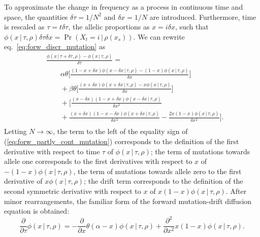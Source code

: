 \documentclass[preprint]{elsarticle}
\newcommand\given{{\,|\,}}
\newcommand\x[1]{\ensuremath{X_{#1}}}
\begin{document}

To approximate the change in frequency as a process in continuous time and space, the quantities $\delta \tau=1/N^2$ and $\delta x=1/N$ are introduced. Furthermore, time is rescaled as $\tau = t\delta \tau$, the allelic proportions as $x=i\delta x$, such that $\phi(x\given\tau,\rho)\delta \tau \delta x =
\Pr(\x{t}=i\given \rho(x_s))$. %
We can rewrite eq.~\eqref{eq:forw_discr_mutation} as
\begin{equation}\label{eq:forw_partly_cont_mutation}
\begin{split}
&%
\frac{\phi(x\given \tau+\delta \tau, \rho)-\phi(x\given \tau, \rho)}{\delta \tau} =\\ 
&\qquad
\alpha\theta \bigg[\frac{(1-x+\delta x)\phi(x-\delta x\given \tau,\rho) - (1-x)\phi(x\given\tau,\rho)}{\delta x}\bigg]\\
&\qquad+\beta\theta \bigg[\frac{(x+\delta x)\phi(x+\delta x\given\tau,\rho) - x\phi(x\given\tau,\rho)}{\delta x}\bigg]\\
&\qquad+\bigg[\frac{(x-\delta x)(1-x+\delta x)\phi(x-\delta x\given\tau,\rho)}{\delta x^2}\\
&\qquad+ \frac{(x+\delta x)(1-x-\delta x)\phi(x+\delta x\given\tau,\rho)}{\delta x^2}-\frac{2x(1-x)\phi(x\given\tau,\rho)}{\delta x^2}\bigg]
.\\
\end{split}
\end{equation}
Letting $N\to\infty$, the term to the left of the equality sign of (\ref{eq:forw_partly_cont_mutation}) corresponds to the definition of the first derivative with respect to time $\tau$ of $\phi(x\given\tau,\rho)$; the term of mutations towards allele one corresponds to the first derivatives with respect to $x$ of $-(1-x)\phi(x\given\tau,\rho)$, the term of mutations towards allele zero to the first derivative of $x\phi(x\given\tau,\rho)$; the drift term corresponds to the definition of the second symmetric derivative with respect to $x$ of $x(1-x)\phi(x\given\tau,\rho)$. After minor rearrangements, the familiar form of the forward mutation-drift diffusion equation is obtained:
\begin{equation}\label{eq:forw_mutdrift}
\frac{\partial}{\partial \tau} \phi(x\given\tau,\rho) = -\frac{\partial}{\partial x}\theta(\alpha-x)\phi(x\given\tau,\rho) +\frac{\partial^2}{\partial x^2}x(1-x)\phi(x\given\tau,\rho).
\end{equation}
\end{document}

